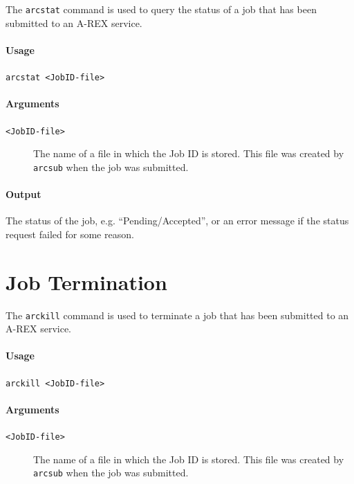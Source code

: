 \documentclass{article}                            %
\begin{document}
The \verb#arcstat# command is used to query the status of a job that
has been submitted to an A-REX service.

\begin{shaded}
\paragraph{Usage} \verb:arcstat <JobID-file>:
\end{shaded}

\paragraph{Arguments}
\begin{description}
\item[\texttt{<JobID-file>}] The name of a file in which the
Job ID is stored. This file was created by \verb:arcsub: when the job
was submitted.
\end{description}

\paragraph{Output} The status of the job, e.g. ``Pending/Accepted'',
or an error message if the status request failed for some reason.


\section{Job Termination}
\label{sec:arckill}

The \verb#arckill# command is used to terminate a job that has been
submitted to an A-REX service.

\begin{shaded}
\paragraph{Usage} \verb:arckill <JobID-file>:
\end{shaded}

\paragraph{Arguments}
\begin{description}
\item[\texttt{<JobID-file>}] The name of a file in which the
Job ID is stored. This file was created by \verb:arcsub: when the job
was submitted.
\end{description}
\end{document}
